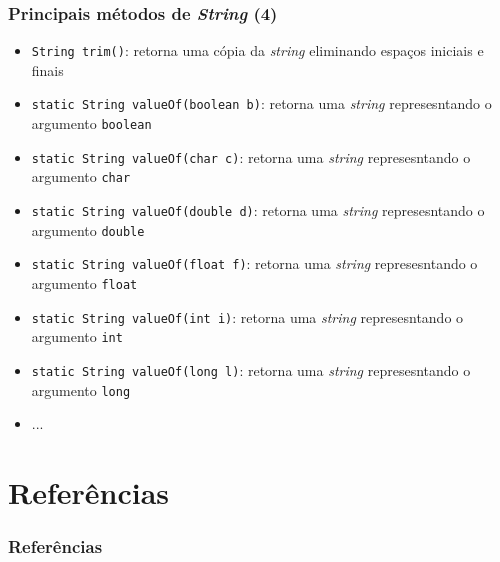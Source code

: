 \documentclass[xcolor={dvipsnames,table},aspectratio=169]{beamer}
\begin{document}
\begin{frame}\frametitle{Principais métodos de \emph{String} (4)}
\begin{itemize}
\item \texttt{String trim()}: retorna uma cópia da \emph{string} eliminando espaços iniciais e finais
\item \texttt{static String valueOf(boolean b)}: retorna uma \emph{string} represesntando o argumento \texttt{boolean}
\item \texttt{static String valueOf(char c)}:  retorna uma \emph{string} represesntando o argumento \texttt{char}
\item \texttt{static String valueOf(double d)}:  retorna uma \emph{string} represesntando o argumento \texttt{double}
\item \texttt{static String valueOf(float f)}:  retorna uma \emph{string} represesntando o argumento \texttt{float}
\item \texttt{static String valueOf(int i)}:  retorna uma \emph{string} represesntando o argumento \texttt{int}
\item \texttt{static String valueOf(long l)}:  retorna uma \emph{string} represesntando o argumento \texttt{long}

\item ...

\end{itemize}
\end{frame}

\section{Referências}

\begin{frame}\frametitle{Referências}
\end{frame}

\end{document}
